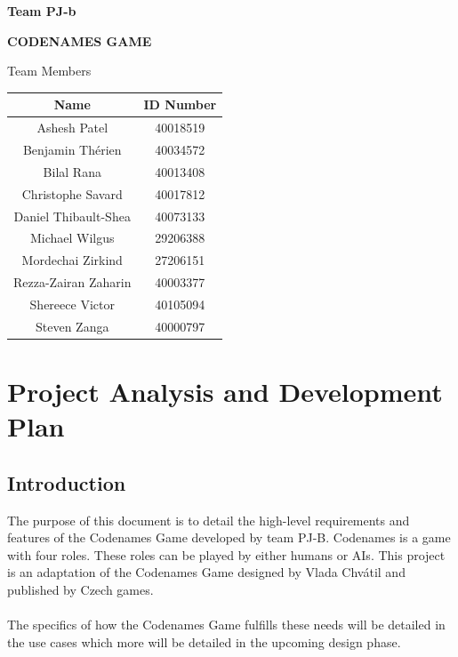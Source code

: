 \documentclass[10pt, a4paper]{article}
\begin{document}
	
\hrulefill
\begin{flushright}
\textbf{Team PJ-b}
\end{flushright}
\hrulefill

\vspace*{0.5in}
\centerline{\bf\Large CODENAMES GAME}

\vspace*{1.5in}


\begin{table}[htbp] 
\begin{center} 
	\begin{center} 
		Team Members\\
		
	\end{center} 
	\begin{tabular}{| c | c |} 
		\hline 
		Name & ID Number \\ 
		\hline\hline 
		Ashesh Patel & 40018519 \\ 
		Benjamin Th\'erien & 40034572\\ 
		Bilal Rana & 40013408 \\
		Christophe Savard & 40017812\\
		Daniel Thibault-Shea & 40073133\\ 
		Michael Wilgus & 29206388 \\ 
		Mordechai Zirkind & 27206151\\
		Rezza-Zairan Zaharin & 40003377 \\
		Shereece Victor & 40105094\\ 
		Steven Zanga & 40000797\\ 
		 
		\hline 
	\end{tabular} 
\end{center} 
\end{table} 


\newpage 
\tableofcontents
\newpage 

\section{Project Analysis and Development Plan}

	\subsection{Introduction}
	
	 The purpose of this document is to detail the high-level requirements and features of the Codenames Game developed by team PJ-B. Codenames is a game with four roles. These roles can be played by either humans or AIs. This project is an adaptation of the Codenames Game designed by Vlada Chv\'atil and published by Czech games.\\
	 \\
	 The specifics of how the Codenames Game fulfills these needs will be detailed in the use cases which more will be detailed in the upcoming design phase.\\
	
\end{document}

